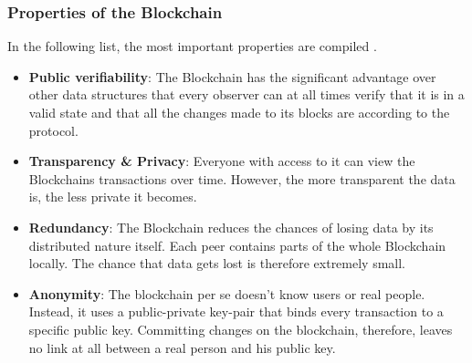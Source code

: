 \subsubsection{Properties of the Blockchain}
In the following list, the most important properties are compiled \cite{Wust2017}.\begin{itemize}
  \item \textbf{Public verifiability}: The Blockchain has the significant advantage over other data structures that every observer can at all times verify that it is in a valid state and that all the changes made to its blocks are according to the protocol.
  \item \textbf{Transparency \& Privacy}: Everyone with access to it can view the Blockchains transactions over time. However, the more transparent the data is, the less private it becomes.
  \item \textbf{Redundancy}: The Blockchain reduces the chances of losing data by its distributed nature itself. Each peer contains parts of the whole Blockchain locally. The chance that data gets lost is therefore extremely small.
  \item \textbf{Anonymity}: The blockchain per se doesn't know users or real people. Instead, it uses a public-private key-pair that binds every transaction to a specific public key. Committing changes on the blockchain, therefore, leaves no link at all between a real person and his public key.
\end{itemize}

